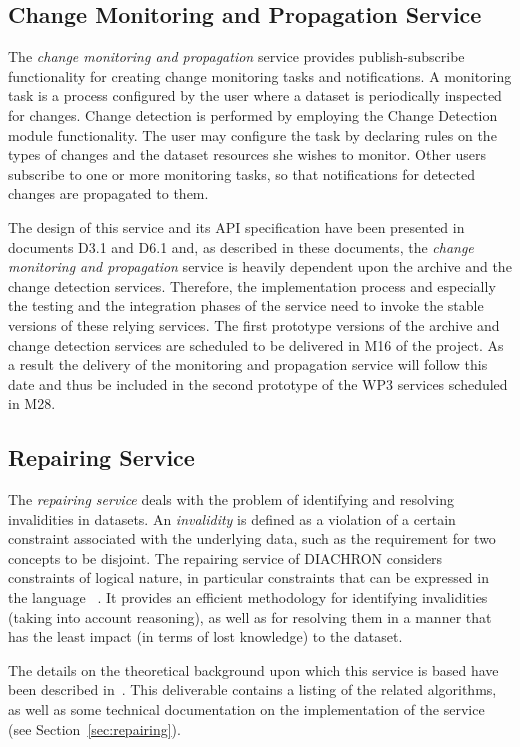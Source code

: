 \subsection{Change Monitoring and Propagation Service}

The \emph{change monitoring and propagation} service provides publish-subscribe functionality for creating change monitoring tasks and notifications. A monitoring task is a process configured by the user where a dataset is periodically inspected for changes. Change detection is performed by employing the Change Detection module functionality. The user may configure the task by declaring rules on the types of changes and the dataset resources she wishes to monitor. Other users subscribe to one or more monitoring tasks, so that notifications for detected changes are propagated to them.

The design of this service and its API specification have been presented in documents D3.1 and D6.1 and, as described in these documents, the \emph{change monitoring and propagation} service is heavily dependent upon the archive and the change detection services. Therefore, the implementation process and especially the testing and the integration phases of the service need to invoke the stable versions of these relying services. The first prototype versions of the archive and change detection services are scheduled to be delivered in M16 of the project. As a result the delivery of the monitoring and propagation service will follow this date and thus be included in the second prototype of the WP3 services scheduled in M28.

\subsection{Repairing Service}

The \emph{repairing service} deals with the problem of identifying and resolving invalidities in datasets. 
An \emph{invalidity} is defined as a violation of a certain constraint associated with the underlying data, such as the requirement for two concepts to be disjoint.
The repairing service of DIACHRON considers constraints of logical nature, in particular constraints that can be expressed in the language ~\cite{dl-litea}. It provides an efficient methodology for identifying invalidities (taking into account  reasoning), as well as for resolving them in a manner that has the least impact (in terms of lost knowledge) to the dataset. 

The details on the theoretical background upon which this service is based have been described in~\cite{d3.1}. This deliverable contains a listing of the related algorithms, as well as some technical documentation on the implementation of the service  (see Section~\ref{sec:repairing}).

